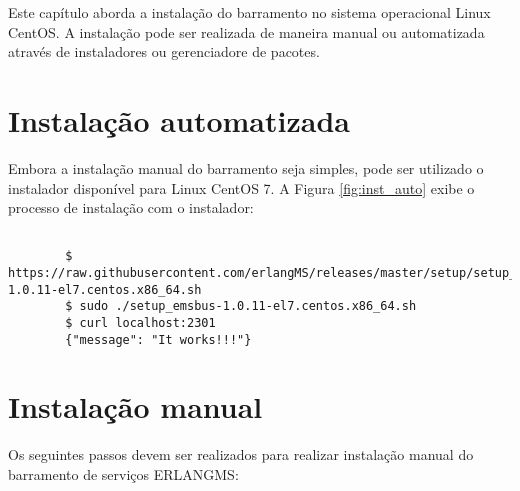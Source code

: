 Este capítulo aborda a instalação do barramento no sistema operacional Linux CentOS. 
A instalação pode ser realizada de maneira manual ou automatizada
através de instaladores ou gerenciadore de pacotes.

\section{Instalação automatizada}

Embora a instalação manual do barramento seja simples, pode ser utilizado o instalador 
disponível para Linux CentOS 7. A Figura \ref{fig:inst_auto} exibe 
o processo de instalação com o instalador:


	\renewcommand{\lstlistingname}{Código}             
	\begin{lstlisting}[Adding Erlang repository entry, label=fig:inst_auto] 

		$ https://raw.githubusercontent.com/erlangMS/releases/master/setup/setup_emsbus-1.0.11-el7.centos.x86_64.sh
		$ sudo ./setup_emsbus-1.0.11-el7.centos.x86_64.sh
		$ curl localhost:2301
		{"message": "It works!!!"}
	\end{lstlisting}



\section{Instalação manual}

Os seguintes passos devem ser realizados para realizar instalação manual do 
barramento de serviços ERLANGMS:


